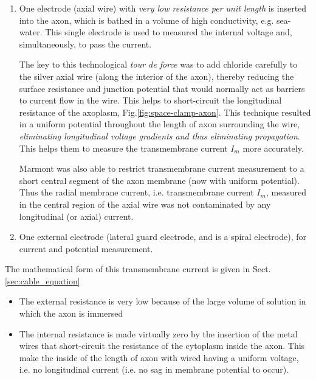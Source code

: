 \begin{enumerate}
  \item   One electrode (axial wire) with {\it very low resistance per unit
  length} is inserted into the axon, which is bathed in a volume of high
  conductivity, e.g. sea-water. 
  This single electrode is used to measured the internal voltage and,
  simultaneously, to pass the current.

The key to this technological {\it tour de force} was to add chloride carefully
to the silver axial wire (along the interior of the axon), thereby reducing the
surface resistance and junction potential that would normally act as barriers to
current flow in the wire.
This helps to short-circuit the longitudinal resistance of the axoplasm,
Fig.\ref{fig:space-clamp-axon}.
This technique resulted in a uniform potential throughout the length of axon
surrounding the wire, {\it eliminating longitudinal voltage gradients and thus
eliminating propagation}. This helps them to measure the transmembrane current
$I_m$ more accurately.

Marmont was also able to restrict transmembrane current measurement to a short
central segment of the axon membrane (now with uniform potential).  Thus the
radial membrane current, i.e. transmembrane current $I_m$, measured in the
central region of the axial wire was not contaminated by any longitudinal (or
axial) current.

  \item One external electrode (lateral guard electrode, and is a spiral
  electrode),  for current and potential measurement.
\end{enumerate}

The mathematical form of this transmembrane current is given in
Sect.\ref{sec:cable_equation}

\begin{itemize}
  \item The external resistance is very low because of the large volume of
  solution in which the axon is immersed

  \item The internal resistance is made virtually zero by the insertion of the
  metal wires that short-circuit the resistance of the cytoplasm inside the
  axon. This make the inside of the length of axon with wired having a uniform
  voltage, i.e. no longitudinal current (i.e. no sag in membrane potential to
  occur).
\end{itemize}


